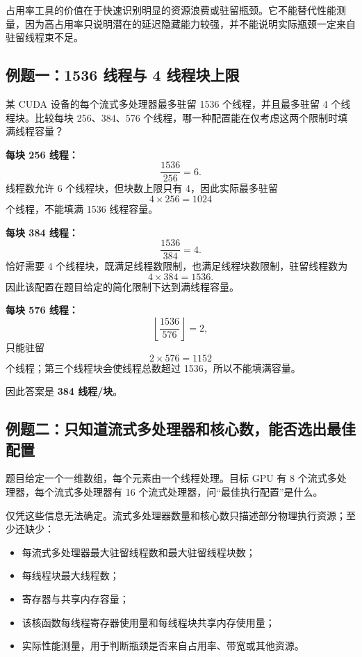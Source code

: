 占用率工具的价值在于快速识别明显的资源浪费或驻留瓶颈。它不能替代性能测量，因为高占用率只说明潜在的延迟隐藏能力较强，并不能说明实际瓶颈一定来自驻留线程束不足。

\subsection{例题一：1536 线程与 4 线程块上限}

某 CUDA 设备的每个流式多处理器最多驻留 1536 个线程，并且最多驻留 4 个线程块。比较每块 256、384、576 个线程，哪一种配置能在仅考虑这两个限制时填满线程容量？

\begin{examplebox}[title=完整推导]
\textbf{每块 256 线程：}
\[
\frac{1536}{256}=6.
\]
线程数允许 6 个线程块，但块数上限只有 4，因此实际最多驻留
\[
4\times256=1024
\]
个线程，不能填满 1536 线程容量。

\textbf{每块 384 线程：}
\[
\frac{1536}{384}=4.
\]
恰好需要 4 个线程块，既满足线程数限制，也满足线程块数限制，驻留线程数为
\[
4\times384=1536.
\]
因此该配置在题目给定的简化限制下达到满线程容量。

\textbf{每块 576 线程：}
\[
\left\lfloor\frac{1536}{576}\right\rfloor=2,
\]
只能驻留
\[
2\times576=1152
\]
个线程；第三个线程块会使线程总数超过 1536，所以不能填满容量。

因此答案是 \textbf{384 线程/块}。
\end{examplebox}

\subsection{例题二：只知道流式多处理器和核心数，能否选出最佳配置}

题目给定一个一维数组，每个元素由一个线程处理。目标 GPU 有 8 个流式多处理器，每个流式多处理器有 16 个流式处理器，问“最佳执行配置”是什么。

仅凭这些信息无法确定。流式多处理器数量和核心数只描述部分物理执行资源；至少还缺少：

\begin{itemize}
  \item 每流式多处理器最大驻留线程数和最大驻留线程块数；
  \item 每线程块最大线程数；
  \item 寄存器与共享内存容量；
  \item 该核函数每线程寄存器使用量和每线程块共享内存使用量；
  \item 实际性能测量，用于判断瓶颈是否来自占用率、带宽或其他资源。
\end{itemize}

